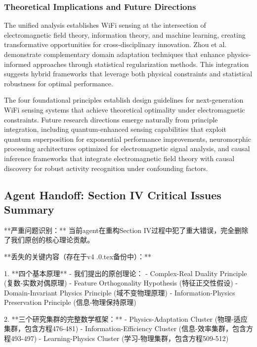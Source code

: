 \documentclass[journal]{IEEEtran}
\begin{document}
\subsubsection{Theoretical Implications and Future Directions}

The unified analysis establishes WiFi sensing at the intersection of electromagnetic field theory, information theory, and machine learning, creating transformative opportunities for cross-disciplinary innovation. Zhou et al. \cite{zhou2024mixstyle} demonstrate complementary domain adaptation techniques that enhance physics-informed approaches through statistical regularization methods. This integration suggests hybrid frameworks that leverage both physical constraints and statistical robustness for optimal performance.

The four foundational principles establish design guidelines for next-generation WiFi sensing systems that achieve theoretical optimality under electromagnetic constraints. Future research directions emerge naturally from principle integration, including quantum-enhanced sensing capabilities that exploit quantum superposition for exponential performance improvements, neuromorphic processing architectures optimized for electromagnetic signal analysis, and causal inference frameworks that integrate electromagnetic field theory with causal discovery for robust activity recognition under confounding factors.



\subsection{Agent Handoff: Section IV Critical Issues Summary}

**严重问题识别：** 当前agent在重构Section IV过程中犯了重大错误，完全删除了我们原创的核心理论贡献。

**丢失的关键内容（存在于v4 .0.tex备份中）：**

1. **四个基本原理** - 我们提出的原创理论：
   - Complex-Real Duality Principle (复数-实数对偶原理)
   - Feature Orthogonality Hypothesis (特征正交性假设)
   - Domain-Invariant Physics Principle (域不变物理原理)
   - Information-Physics Preservation Principle (信息-物理保持原理)

2. **三个研究集群的完整数学框架：**
   - Physics-Adaptation Cluster (物理-适应集群，包含方程476-481)
   - Information-Efficiency Cluster (信息-效率集群，包含方程493-497)
   - Learning-Physics Cluster (学习-物理集群，包含方程509-512)
\end{document}
